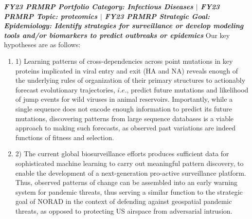 \documentclass[onecolumn, compsoc,12pt]{IEEEtran}
\begin{document}
{\bf \itshape FY23 PRMRP Portfolio Category: Infectious Diseases $\vert$ FY23 PRMRP Topic: proteomics $\vert$  FY23 PRMRP Strategic Goal: Epidemiology: Identify strategies for surveillance or develop modeling tools and/or biomarkers to predict outbreaks or epidemics}
Our key hypotheses are as follows:
\begin{enumerate} 
[label=$\square$, leftmargin=0pt,
labelindent=0em, topsep=0.1em, labelsep=*, itemsep=.5em,itemindent=1em]
\item 
1) Learning patterns of cross-dependencies across point mutations in key proteins implicated in viral entry and exit (HA and NA) reveals enough of the underlying rules of organization of their primary structures to actionably forecast evolutionary trajectories, $i.e.$, predict future mutations and likelihood of jump events for wild \infl viruses in animal reservoirs. Importantly, while a single sequence does not encode enough information to predict its future mutations, discovering patterns from large sequence databases is a viable approach to making such forecasts, as observed past variations are indeed functions of fitness and selection.
\item  
2) The current global biosurveillance efforts produces sufficient data for sophisticated  machine  learning to carry out meaningful pattern discovery, to enable the development of a next-generation pro-active surveillance platform. Thus,  observed patterns of change can be assembled into an early warning system for pandemic threats, thus serving a similar function to the strategic goal of NORAD in the context of defending against geospatial pandemic threats, as opposed to protecting US airspace from adversarial intrusion.
\end{enumerate}
\end{document}
